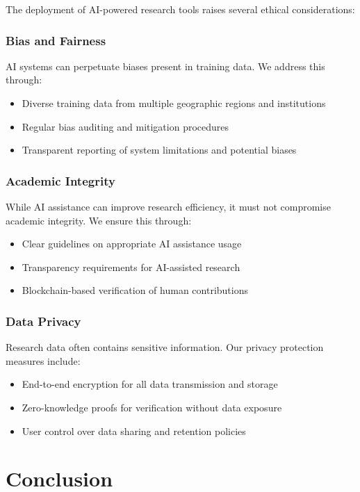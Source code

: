 \documentclass[10pt,twocolumn]{article}
\begin{document}
The deployment of AI-powered research tools raises several ethical considerations:

\subsubsection{Bias and Fairness}

AI systems can perpetuate biases present in training data. We address this through:
\begin{itemize}
    \item Diverse training data from multiple geographic regions and institutions
    \item Regular bias auditing and mitigation procedures
    \item Transparent reporting of system limitations and potential biases
\end{itemize}

\subsubsection{Academic Integrity}

While AI assistance can improve research efficiency, it must not compromise academic integrity. We ensure this through:
\begin{itemize}
    \item Clear guidelines on appropriate AI assistance usage
    \item Transparency requirements for AI-assisted research
    \item Blockchain-based verification of human contributions
\end{itemize}

\subsubsection{Data Privacy}

Research data often contains sensitive information. Our privacy protection measures include:
\begin{itemize}
    \item End-to-end encryption for all data transmission and storage
    \item Zero-knowledge proofs for verification without data exposure
    \item User control over data sharing and retention policies
\end{itemize}

\section{Conclusion}
\end{document}
